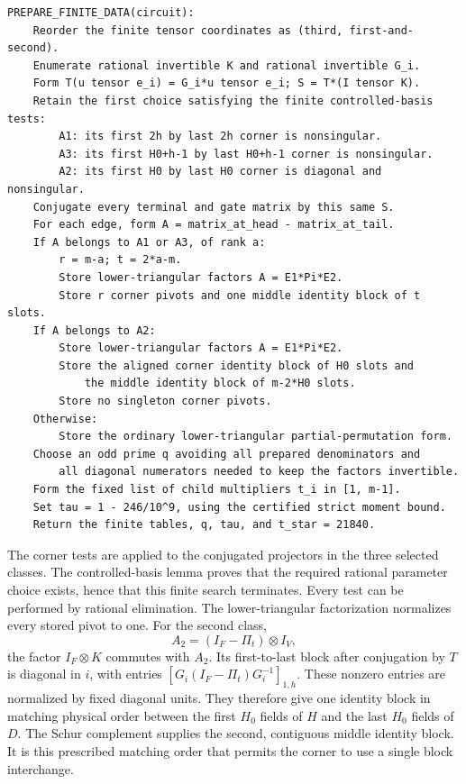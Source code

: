 \begin{verbatim}
PREPARE_FINITE_DATA(circuit):
    Reorder the finite tensor coordinates as (third, first-and-second).
    Enumerate rational invertible K and rational invertible G_i.
    Form T(u tensor e_i) = G_i*u tensor e_i; S = T*(I tensor K).
    Retain the first choice satisfying the finite controlled-basis tests:
        A1: its first 2h by last 2h corner is nonsingular.
        A3: its first H0+h-1 by last H0+h-1 corner is nonsingular.
        A2: its first H0 by last H0 corner is diagonal and nonsingular.
    Conjugate every terminal and gate matrix by this same S.
    For each edge, form A = matrix_at_head - matrix_at_tail.
    If A belongs to A1 or A3, of rank a:
        r = m-a; t = 2*a-m.
        Store lower-triangular factors A = E1*Pi*E2.
        Store r corner pivots and one middle identity block of t slots.
    If A belongs to A2:
        Store lower-triangular factors A = E1*Pi*E2.
        Store the aligned corner identity block of H0 slots and
            the middle identity block of m-2*H0 slots.
        Store no singleton corner pivots.
    Otherwise:
        Store the ordinary lower-triangular partial-permutation form.
    Choose an odd prime q avoiding all prepared denominators and
        all diagonal numerators needed to keep the factors invertible.
    Form the fixed list of child multipliers t_i in [1, m-1].
    Set tau = 1 - 246/10^9, using the certified strict moment bound.
    Return the finite tables, q, tau, and t_star = 21840.
\end{verbatim}

The corner tests are applied to the conjugated projectors in the three
selected classes.  The controlled-basis lemma proves that the required
rational parameter choice exists, hence that this finite search
terminates.  Every test can be performed by rational elimination.
The lower-triangular factorization normalizes every stored pivot to one.
For the second class,
\[
 A_2=(I_F-\Pi_t)\otimes I_V,
\]
the factor $I_F\otimes K$ commutes with $A_2$.  Its first-to-last block
after conjugation by $T$ is diagonal in $i$, with entries
$[G_i(I_F-\Pi_t)G_i^{-1}]_{1,h}$.  These nonzero entries are normalized
by fixed diagonal units.  They therefore give one identity block in
matching physical order between the first $H_0$ fields of $H$ and the
last $H_0$ fields of $D$.  The Schur complement supplies the second,
contiguous middle identity block.  It is this prescribed matching order
that permits the corner to use a single block interchange.

